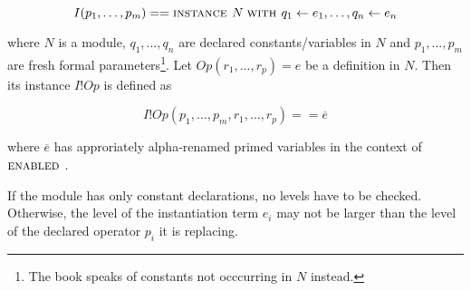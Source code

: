 \documentclass[a4paper]{article}
\theoremstyle{definition}
\begin{document}
$$I(p_1,\ldots,p_m) == \textsc{instance } N\;\textsc{with } q_1 \leftarrow e_1, \ldots,q_n \leftarrow
  e_n$$

where $N$ is a module, $q_1,\ldots,q_n$ are declared constants/variables in $N$
 and $p_1,\ldots,p_m$ are fresh formal parameters\footnote{The book speaks of
   constants not occcurring in $N$ instead.}. Let $Op(r_1,\ldots,r_p) = e$ be a
 definition in $N$. Then its instance $I!Op$ is defined as

$$I!Op(p_1,\ldots,p_m,r_1,\ldots,r_p) == \overline{e}$$

where $\overline{e}$ has approriately alpha-renamed primed variables in the
 context of $\textsc{enabled }$.

If the module has only constant declarations, no levels have to be checked.
 Otherwise, the level of the instantiation term $e_i$ may not be larger than
 the level of the declared operator $p_i$ it is replacing.
\end{document}
